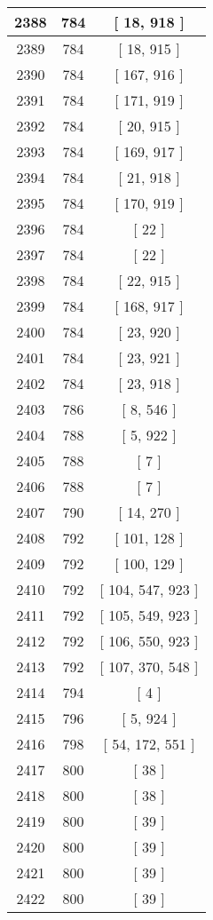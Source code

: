 \begin{center}
\begin{longtable}[H]{|| c c c ||}
\hline
2388 & 784 & [ 18, 918 ] \\ 
\hline
2389 & 784 & [ 18, 915 ] \\ 
\hline
2390 & 784 & [ 167, 916 ] \\ 
\hline
2391 & 784 & [ 171, 919 ] \\ 
\hline
2392 & 784 & [ 20, 915 ] \\ 
\hline
2393 & 784 & [ 169, 917 ] \\ 
\hline
2394 & 784 & [ 21, 918 ] \\ 
\hline
2395 & 784 & [ 170, 919 ] \\ 
\hline
2396 & 784 & [ 22 ] \\ 
\hline
2397 & 784 & [ 22 ] \\ 
\hline
2398 & 784 & [ 22, 915 ] \\ 
\hline
2399 & 784 & [ 168, 917 ] \\ 
\hline
2400 & 784 & [ 23, 920 ] \\ 
\hline
2401 & 784 & [ 23, 921 ] \\ 
\hline
2402 & 784 & [ 23, 918 ] \\ 
\hline
2403 & 786 & [ 8, 546 ] \\ 
\hline
2404 & 788 & [ 5, 922 ] \\ 
\hline
2405 & 788 & [ 7 ] \\ 
\hline
2406 & 788 & [ 7 ] \\ 
\hline
2407 & 790 & [ 14, 270 ] \\ 
\hline
2408 & 792 & [ 101, 128 ] \\ 
\hline
2409 & 792 & [ 100, 129 ] \\ 
\hline
2410 & 792 & [ 104, 547, 923 ] \\ 
\hline
2411 & 792 & [ 105, 549, 923 ] \\ 
\hline
2412 & 792 & [ 106, 550, 923 ] \\ 
\hline
2413 & 792 & [ 107, 370, 548 ] \\ 
\hline
2414 & 794 & [ 4 ] \\ 
\hline
2415 & 796 & [ 5, 924 ] \\ 
\hline
2416 & 798 & [ 54, 172, 551 ] \\ 
\hline
2417 & 800 & [ 38 ] \\ 
\hline
2418 & 800 & [ 38 ] \\ 
\hline
2419 & 800 & [ 39 ] \\ 
\hline
2420 & 800 & [ 39 ] \\ 
\hline
2421 & 800 & [ 39 ] \\ 
\hline
2422 & 800 & [ 39 ] \\ 

\end{longtable}
\end{center}
